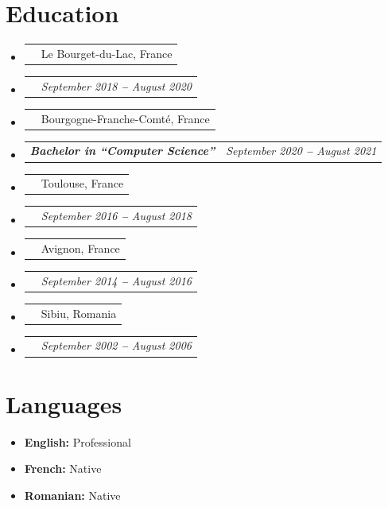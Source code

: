 \documentclass[letterpaper,11pt]{article}
\makeatletter
\newcommand{\bulletItem}[1]{
  \item\small{
    {#1}
  }
}
\newcommand{\companyNameAndLocationHeading}[2]{
  \item
    \begin{tabular*}{1.0\textwidth}[b]{l@{\extracolsep{\fill}}r}
      \textbf{#1} & #2
    \end{tabular*}
}
\newcommand{\titleAndDateHeading}[2]{
    \item
    \begin{tabular*}{1.0\textwidth}[b]{l@{\extracolsep{\fill}}r}
      {\bfseries\itshape\small #1} & \itshape\small #2
    \end{tabular*}
}
\newcommand{\sectionListStart}{\begin{itemize}[leftmargin=0pt, label={}]}
\newcommand{\sectionListEnd}{\end{itemize}}
\newcommand{\bref}[2]{\href{#1}{\color{blue}{#2}}}
\makeatother
\begin{document}
\section{Education}
\sectionListStart
\companyNameAndLocationHeading
{\bref{https://scem-eset.univ-smb.fr/}{Savoie Mont Blanc University}}{Le Bourget-du-Lac, France}
\titleAndDateHeading
{\bref{https://github.com/slalomeset/diplomas/blob/main/master.pdf}{Masters in \enquote{Electronic of Embedded Systems and Telecommunications}}}{September 2018 \textbf{--} August 2020}

\companyNameAndLocationHeading
{\bref{https://sup-fc.univ-fcomte.fr/informatique}{University of Franche-Comté}}{Bourgogne-Franche-Comté, France}
\titleAndDateHeading
{Bachelor in \enquote{Computer Science}}{September 2020 \textbf{--} August 2021}

\companyNameAndLocationHeading
{\bref{https://www.univ-tlse3.fr/decouvrir-nos-diplomes/licence-parcours-eea-fondamental-eea-f}{Toulouse 3 University \enquote{Paul Sabatier}}}{Toulouse, France}
\titleAndDateHeading
{\bref{https://github.com/slalomeset/diplomas/blob/main/bachelor.pdf}{Bachelor in \enquote{Electronics, Electrical Engineering and Automation.}}}{September 2016 \textbf{--} August 2018}

\companyNameAndLocationHeading
{\bref{https://www.cned.fr/}{CNED \enquote{Centre National d'Enseignement à Distance}}}{Avignon, France}
\titleAndDateHeading
{\bref{https://github.com/slalomeset/diplomas/blob/main/bts.pdf}{BTEC HND in \enquote{Electrical Engineering and Electronics }}}{September 2014 \textbf{--} August 2016}

\companyNameAndLocationHeading
{\bref{https://www.armyacademy.ro/engleza/fmm.php}{\enquote{Nicolae Balcescu} Land Forces Academy }}{Sibiu, Romania }
\titleAndDateHeading
{\bref{https://github.com/slalomeset/diplomas/blob/main/military_academy.pdf}{ Bachelor's Degree in Management of Military Organizations }}{September 2002 \textbf{--} August 2006}
\sectionListEnd

\vspace{0.25em} %

\section{Languages}
\sectionListStart
\bulletItem{\textbf{English:}{ Professional} \bref{https://github.com/slalomeset/certificates/blob/main/toeic_english.pdf}{[TOEIC certificate]} }
\bulletItem{\textbf{French:}{ Native}}
\bulletItem{\textbf{Romanian:}{ Native}}
\sectionListEnd
\vspace{0.25em} %
\end{document}
